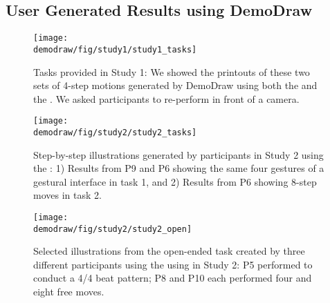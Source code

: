 \begin{appendices}

\chapter{User Generated Results using DemoDraw}
\renewcommand\thefigure{A.\arabic{figure}}
\setcounter{figure}{0}
\begin{figure}
   \begin{minipage}[b]{1.0\textwidth}
     \centering
    \texttt{[image: \\demodraw/fig/study1/study1\_tasks]}
    \caption{Tasks provided in Study 1: We showed the printouts of these two sets of 4-step motions generated by DemoDraw using both the \phaseI{} and the \phaseII{}. We asked participants to re-perform in front of a camera.}
    \label{fig:study_review_tasks}
   \end{minipage}

   \vspace{6mm}
   \begin{minipage}[b]{1.0\textwidth}
     \centering
    \texttt{[image: \\demodraw/fig/study2/study2\_tasks]}
    \caption{Step-by-step illustrations generated by participants in Study 2 using the \phaseI{}: 1) Results from P9 and P6 showing the same four gestures of a gestural interface in task 1, and 2) Results from P6 showing 8-step moves in task 2.}
    \label{fig:study_authoring_tasks}
   \end{minipage}

   \vspace{6mm}
   \begin{minipage}[b]{1.0\textwidth}
     \centering
    \texttt{[image: \\demodraw/fig/study2/study2\_open]}
    \caption{Selected illustrations from the open-ended task created by three different participants using the using \phaseI{} in Study 2: P5 performed to conduct a 4/4 beat pattern; P8 and P10 each performed four and eight free moves.}
    \label{fig:open_ended_examples}
   \end{minipage}
 \end{figure}

\end{appendices}
